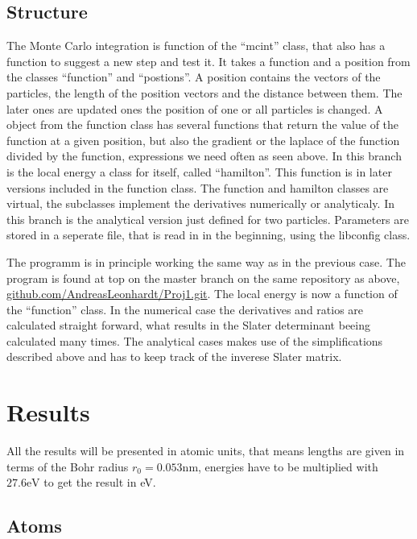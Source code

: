 \documentclass[a4paper,10pt]{article}
\begin{document}
\subsection{Structure}





The Monte Carlo integration is function of the ``mcint'' class, that also has a function to suggest a new step 
and test it. It takes a function and a position from the classes ``function'' and ``postions''. A position contains the vectors of the particles, 
the length of the position vectors and
the distance between them. The later ones are updated ones the position of one or all particles is changed. 
A object from the function class has several functions that return the value of the function at a given position, 
but also the gradient or the laplace of the function divided by the function, expressions we need often as seen above. 
In this branch is the local energy a class for itself, called ``hamilton''. This function is in later versions included in the function class.
The function and hamilton classes are virtual, the subclasses implement the derivatives numerically or analyticaly. 
In this branch is the analytical version just defined for two particles. 
Parameters are stored in a seperate file, that is read in in the beginning, using the libconfig class.

The programm is in principle working the same way as in the previous case. The program is found at top on the master branch on the same repository as above,
\href{https://github.com/AndreasLeonhardt/Proj1.git}{github.com/AndreasLeonhardt/Proj1.git}.
The local energy is now a function of the ``function'' class. 
In the numerical case the derivatives and ratios are calculated straight forward, what results in the Slater determinant beeing calculated many times.
The analytical cases makes use of the simplifications described above and has to keep track of the inverese Slater matrix. 


\section{Results}
All the results will be presented in atomic units, that means lengths are given in terms of the Bohr radius $r_0 = 0.053\text{nm}$, energies have to be multiplied with $27.6\text{eV}$ 
to get the result in eV. 

\subsection{Atoms}
\end{document}
